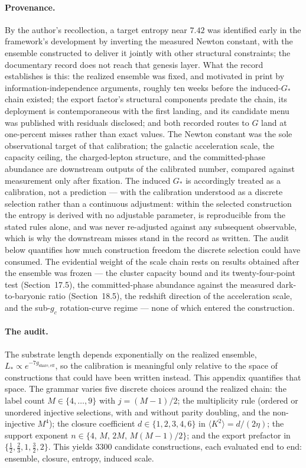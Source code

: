 \documentclass[11pt]{article}
\begin{document}
\paragraph{Provenance.} By the author's recollection, a target entropy near $7.42$ was identified early in the framework's development by inverting the measured Newton constant, with the ensemble constructed to deliver it jointly with other structural constraints; the documentary record does not reach that genesis layer. What the record establishes is this: the realized ensemble was fixed, and motivated in print by information-independence arguments, roughly ten weeks before the induced-$G_*$ chain existed; the export factor's structural components predate the chain, its deployment is contemporaneous with the first landing, and its candidate menu was published with residuals disclosed; and both recorded routes to $G$ land at one-percent misses rather than exact values. The Newton constant was the sole observational target of that calibration; the galactic acceleration scale, the capacity ceiling, the charged-lepton structure, and the committed-phase abundance are downstream outputs of the calibrated number, compared against measurement only after fixation. The induced $G_*$ is accordingly treated as a calibration, not a prediction --- with the calibration understood as a discrete selection rather than a continuous adjustment: within the selected construction the entropy is derived with no adjustable parameter, is reproducible from the stated rules alone, and was never re-adjusted against any subsequent observable, which is why the downstream misses stand in the record as written. The audit below quantifies how much construction freedom the discrete selection could have consumed. The evidential weight of the scale chain rests on results obtained after the ensemble was frozen --- the cluster capacity bound and its twenty-four-point test (Section~17.5), the committed-phase abundance against the measured dark-to-baryonic ratio (Section~18.5), the redshift direction of the acceleration scale, and the sub-$g_c$ rotation-curve regime --- none of which entered the construction.

\paragraph{The audit.} The substrate length depends exponentially on the realized ensemble, $L_*\propto e^{-7g_{\mathrm{share,eff}}}$, so the calibration is meaningful only relative to the space of constructions that could have been written instead. This appendix quantifies that space. The grammar varies five discrete choices around the realized chain: the label count $M\in\{4,\dots,9\}$ with $j=(M-1)/2$; the multiplicity rule (ordered or unordered injective selections, with and without parity doubling, and the non-injective $M^4$); the closure coefficient $d\in\{1,2,3,4,6\}$ in $\langle K^2\rangle=d/(2\eta)$; the support exponent $n\in\{4,\,M,\,2M,\,M(M-1)/2\}$; and the export prefactor in $\{\tfrac12,\tfrac23,1,\tfrac32,2\}$. This yields $3300$ candidate constructions, each evaluated end to end: ensemble, closure, entropy, induced scale.
\end{document}
